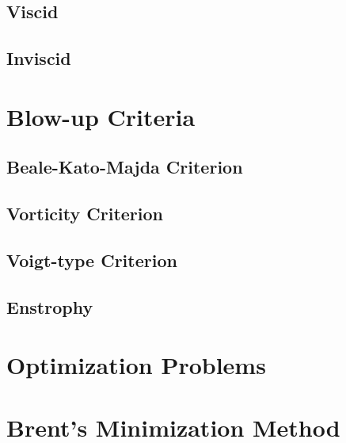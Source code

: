 \documentclass[12pt]{article}
\begin{document}
\begin{flushleft}
\subsection{Viscid}
\subsection{Inviscid}

\section{Blow-up Criteria}
\subsection{Beale-Kato-Majda Criterion}
\subsection{Vorticity Criterion}
\subsection{Voigt-type Criterion}
\subsection{Enstrophy}


\section{Optimization Problems}
\section{Brent's Minimization Method}


\end{flushleft}
\end{document}
